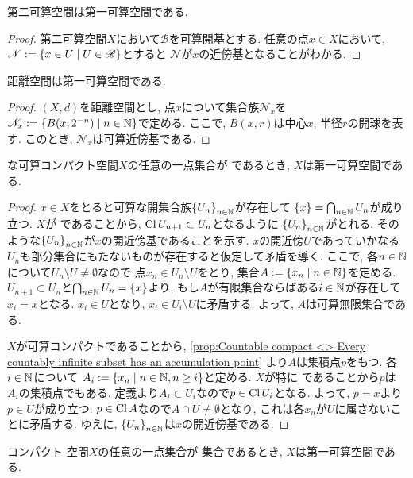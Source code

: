 \documentclass[uplatex, dvipdfmx, a4paper, 12pt, class=jsbook, crop=false]{standalone}
\begin{document}
\begin{proposition}
	第二可算空間は第一可算空間である.
\end{proposition}

\begin{proof}
	第二可算空間$ X $において$ \mathscr{B} $を可算開基とする.
	任意の点$ x \in X $において, $ \mathscr{N} \defeq \setcomp{x \in U}{U \in \mathscr{B}} $とすると
	$ \mathscr{N} $が$ x $の近傍基となることがわかる.
\end{proof}

\begin{proposition}
	距離空間は第一可算空間である.
\end{proposition}

\begin{proof}
	$ (X, d) $を距離空間とし, 点$ x $について集合族$ \mathscr{N}_x $を
	$ \mathscr{N}_x \defeq \setcomp{B(x,2^{-n})}{n \in \N} $で定める.
	ここで, $ B(x,r) $は中心$ x $, 半径$ r $の開球を表す.
	このとき, $ \mathscr{N}_x $は可算近傍基である.
\end{proof}

\begin{proposition}
	 な可算コンパクト空間$ X $の任意の一点集合が \Gdelta であるとき,
	$ X $は第一可算空間である.
\end{proposition}

\begin{proof}
	$ x \in X $をとると可算な開集合族$ \lrbrace{U_n}_{n \in \N} $が存在して
	$ \lrbrace{x} = \bigcap_{n \in \N} U_n $が成り立つ.
	$ X $が  であることから, $ \mathop{\mathrm{Cl}}\nolimits U_{n+1} \subset U_n $となるように
	$ \lrbrace{U_n}_{n \in \N} $がとれる.
	そのような$ \lrbrace{U_n}_{n \in \N} $が$ x $の開近傍基であることを示す.
	$ x $の開近傍$ U $であっていかなる$ U_n $も部分集合にもたないものが存在すると仮定して矛盾を導く.
	ここで, 各$ n \in \mathbb{N} $について$ U_n \setminus U \neq \emptyset $なので
	点$ x_n \in U_n \setminus U $をとり, 集合$ A \defeq \setcomp{x_n}{n \in \N} $を定める.
	$ U_{n+1} \subset U_n $と$ \bigcap_{n \in \N} U_n = \lrbrace{x} $より,
	もし$ A $が有限集合ならばある$ i \in \mathbb{N} $が存在して$ x_i = x $となる.
	$ x_i \in U $となり, $ x_i \in U_i \setminus U $に矛盾する.
	よって, $ A $は可算無限集合である.

	$ X $が可算コンパクトであることから, \cref{prop:Countable compact <> Every countably infinite subset has an accumulation point}
	より$ A $は集積点$ p $をもつ. 各$ i \in \mathbb{N} $について
	$ A_i \defeq \setcomp{x_n}{n \in \N, n \geq i} $と定める.
	$ X $が特に  であることから$ p $は$ A_i $の集積点でもある.
	定義より$ A_i \subset U_i $なので$ p \in \mathop{\mathrm{Cl}}\nolimits U_i $となる.
	よって, $ p = x $より$ p \in U $が成り立つ.
	$ p \in \mathop{\mathrm{Cl}}\nolimits A $なので$ A \cap U \neq \emptyset $となり,
	これは各$ x_n $が$ U $に属さないことに矛盾する.
	ゆえに, $ \lrbrace{U_n}_{n \in \N} $は$ x $の開近傍基である.
\end{proof}

\begin{corollary}
	コンパクト \Hausdorff 空間$ X $の任意の一点集合が \Gdelta 集合であるとき,
	$ X $は第一可算空間である.
\end{corollary}
\end{document}
